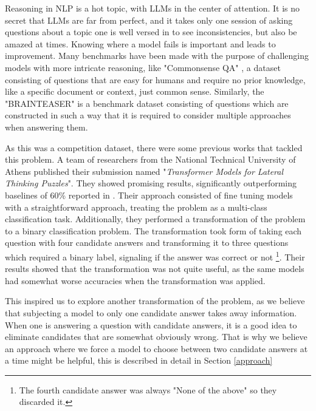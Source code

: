 Reasoning in NLP is a hot topic, with LLMs in the center of attention.  It is no secret that 
LLMs are far from perfect, and it takes only one session of asking questions about a
topic one is well versed in to see inconsistencies, but also be amazed at times.  Knowing where
a model fails is important and leads to improvement.  Many benchmarks have been made with the
purpose of challenging models with more intricate reasoning, like "Commonsense QA"
\citep{commonsenseQA}, a dataset consisting of questions that are easy for humans and require
no prior knowledge, like a specific document or context, just common sense. Similarly, the "BRAINTEASER"
\citep{semeval} is a benchmark dataset consisting of questions which are constructed
in such a way that it is required to consider multiple approaches when answering them.

As this was a competition dataset, there were some previous works that tackled this problem. 
A team of researchers from the National Technical University of Athens published their submission
\citep{ails-lab} named "\textit{Transformer Models for Lateral Thinking Puzzles}".  They showed promising
results, significantly outperforming baselines of 60\% reported in \citep{semeval}. Their approach consisted
of fine tuning models with a straightforward approach, treating the problem as a
multi-class classification task. Additionally, they performed a
transformation of the problem to a binary classification problem.  The transformation took form of
taking each question with four candidate answers and transforming it to three questions which 
required a binary label, signaling if the answer was correct or not \footnote[1]{The fourth candidate
answer was always "None of the above" so they discarded it.}. Their results showed that the 
transformation was not quite useful, as the same models had somewhat worse accuracies when
the transformation was applied.  

This inspired us to explore another transformation of the problem, as we believe that subjecting
a model to only one candidate answer takes away information.  When one is answering a question
with candidate answers, it is a good idea to eliminate candidates that are somewhat obviously wrong.
That is why we believe an approach where we force a model to choose between two candidate answers
at a time might be helpful, this is described in detail in Section \ref{approach}
